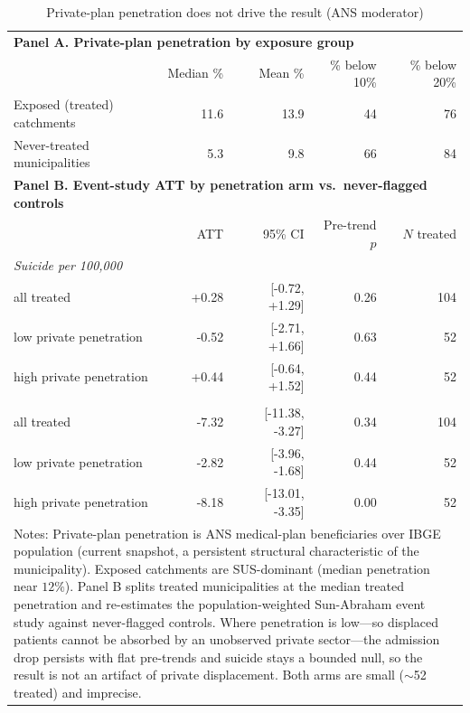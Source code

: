 \begin{table}[!htbp]\centering
\caption{Private-plan penetration does not drive the result (ANS moderator)}
\label{tab:ans-private-moderator}
\small
\begin{tabular}{lrrrr}
\toprule
\multicolumn{5}{l}{\textbf{Panel A. Private-plan penetration by exposure group}} \\
 & Median \% & Mean \% & \% below 10\% & \% below 20\% \\
\midrule
Exposed (treated) catchments & 11.6 & 13.9 & 44 & 76 \\
Never-treated municipalities & 5.3 & 9.8 & 66 & 84 \\
\midrule
\multicolumn{5}{l}{\textbf{Panel B. Event-study ATT by penetration arm vs.\ never-flagged controls}} \\
 & ATT & 95\% CI & Pre-trend $p$ & $N$ treated \\
\midrule
\multicolumn{5}{l}{\emph{Suicide per 100{,}000}} \\
\quad all treated & +0.28 & [-0.72, +1.29] & 0.26 & 104 \\
\quad low private penetration & -0.52 & [-2.71, +1.66] & 0.63 & 52 \\
\quad high private penetration & +0.44 & [-0.64, +1.52] & 0.44 & 52 \\
\addlinespace
\multicolumn{5}{l}{\emph{Inpatient psychiatric admissions per 1{,}000}} \\
\quad all treated & -7.32 & [-11.38, -3.27] & 0.34 & 104 \\
\quad low private penetration & -2.82 & [-3.96, -1.68] & 0.44 & 52 \\
\quad high private penetration & -8.18 & [-13.01, -3.35] & 0.00 & 52 \\
\bottomrule
\multicolumn{5}{p{0.94\textwidth}}{\footnotesize Notes: Private-plan penetration is ANS medical-plan beneficiaries over IBGE population (current snapshot, a persistent structural characteristic of the municipality). Exposed catchments are SUS-dominant (median penetration near $12\%$). Panel B splits treated municipalities at the median treated penetration and re-estimates the population-weighted Sun-Abraham event study against never-flagged controls. Where penetration is low---so displaced patients cannot be absorbed by an unobserved private sector---the admission drop persists with flat pre-trends and suicide stays a bounded null, so the result is not an artifact of private displacement. Both arms are small ($\sim$52 treated) and imprecise.}\\
\end{tabular}
\end{table}
